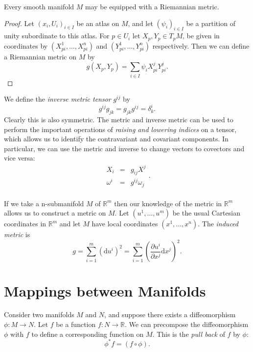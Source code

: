 \begin{thm}
Every smooth manifold $M$ may be equipped with a Riemannian metric.
\end{thm}
\begin{proof}
Let $(x_i,U_i)_{i\in I}$ be an atlas on $M$, and let $(\psi_i)_{i\in I}$ be a
partition of unity subordinate to this atlas. For $p\in U_i$ let $X_p,Y_p\in
T_pM$, be given in coordinates by $(X_{pi}^1,\dots,X_{pi}^n)$ and
$(Y_{pi}^1,\dots,Y_{pi}^n)$ respectively. Then we can define a Riemannian metric
on $M$ by
\[ g(X_p,Y_p)=\sum_{i\in I} \psi_i X^j_{pi} Y^j_{pi}. \]
\end{proof}

We define the \textit{inverse metric tensor} $g^{ij}$ by 
\[ g^{ij}g_{jk}=g_{jk}g^{ij}=\delta^i_k. \]
Clearly this is also symmetric. The metric and inverse metric can be used to
perform the important operations of \textit{raising and lowering indices} on a
tensor, which allows us to identify the contravariant and covariant components.
In particular, we can use the metric and inverse to change vectors to covectors
and vice versa:
\[\begin{array}{lcl}
X_i &=& g_{ij} X^j \\
\omega^i &=& g^{ij}\omega_j
\end{array}.\]\\

If we take a n-submanifold $M$ of $\mathbb{R}^m$ then our knowledge of the
metric in $\mathbb{R}^m$ allows us to construct a metric on $M$. Let
$(u^1,\dots,u^m)$ be the usual Cartesian coordinates in $\mathbb{R}^m$ and let
$M$ have local coordinates $(x^1,\dots,x^n)$. The \textit{induced metric} is
\cite{Lee}
\begin{equation} g=\sum^{m}_{i=1}
(\mbox{d}u^i)^2=\sum^{m}_{i=1}\left(\frac{\partial u^i}{\partial
x^j}\mbox{d}x^j\right)^2. \label{eqn:inducedmetric}\end{equation}

\section{Mappings between Manifolds}

Consider two manifolds $M$ and $N$, and suppose there exists a diffeomorphism $\phi:M\rightarrow N$. Let $f$ be a function $f:N\rightarrow \mathbb{R}$. We can precompose the diffeomorphism $\phi$ with $f$ to define a corresponding function on $M$. This is the \textit{pull back} of $f$ by $\phi$:
\begin{equation} \phi^* f = (f\circ \phi). \label{eq:pullback} \end{equation}

